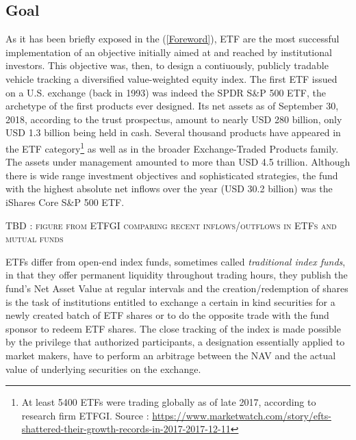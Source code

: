 \subsection{Goal}
As it has been briefly exposed in the  (\autoref{Foreword}), ETF are the most successful implementation of an objective initially aimed at and reached by institutional investors. This objective was, then, to design a contiuously, publicly tradable vehicle tracking a diversified value-weighted equity index. The first ETF issued on a U.S. exchange (back in 1993)  was indeed the SPDR S\&P 500 ETF, the archetype of the first products ever designed. Its net assets as of September 30, 2018, according to the trust prospectus, amount to nearly USD 280 billion, only USD 1.3 billion being held in cash. Several thousand products have appeared in the ETF category\footnote{At least 5400 ETFs were trading globally as of late 2017, according to research firm ETFGI. Source : \url{https://www.marketwatch.com/story/efts-shattered-their-growth-records-in-2017-2017-12-11}} as well as in the broader Exchange-Traded Products family. The assets under management amounted to more than USD 4.5 trillion. Although there is wide range investment objectives and sophisticated strategies, the fund with the highest absolute net inflows over the year (USD 30.2 billion) was the iShares Core S\&P 500 ETF.

\begin{center}
  \textsc{TBD : figure from ETFGI comparing recent inflows/outflows in ETFs and mutual funds}
  \end{center}

ETFs differ from open-end index funds, sometimes called \textit{traditional index funds}, in that they offer permanent liquidity throughout trading hours, they publish the fund's Net Asset Value at regular intervals and the creation/redemption of shares is the task of institutions entitled to exchange a certain in kind securities for a newly created batch of ETF shares or to do the opposite trade with the fund sponsor to redeem ETF shares. The close tracking of the index is made possible by the privilege that authorized participants, a designation essentially applied to market makers, have to perform an arbitrage between the NAV and the actual value of underlying securities on the exchange. \parencite{Ben-David2017}

